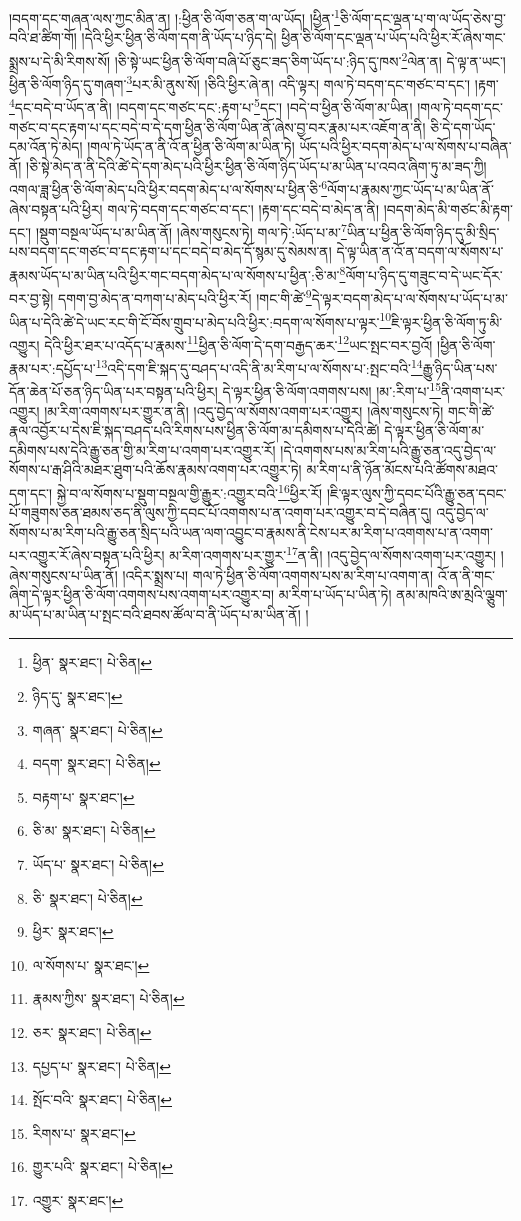 །བདག་དང་གཞན་ལས་ཀྱང་མིན་ན། །:ཕྱིན་ཅི་ལོག་ཅན་ག་ལ་ཡོད། །ཕྱིན་\footnote{ཕྱིན་  སྣར་ཐང་།  པེ་ཅིན། }ཅི་ལོག་དང་ལྡན་པ་ག་ལ་ཡོད་ཅེས་བྱ་བའི་ཐ་ཚིག་གོ། །དེའི་ཕྱིར་ཕྱིན་ཅི་ལོག་དག་ནི་ཡོད་པ་ཉིད་དེ། ཕྱིན་ཅི་ལོག་དང་ལྡན་པ་ཡོད་པའི་ཕྱིར་རོ་ཞེས་གང་སྨྲས་པ་དེ་མི་རིགས་སོ། །ཅི་སྟེ་ཡང་ཕྱིན་ཅི་ལོག་བཞི་པོ་ཅུང་ཟད་ཅིག་ཡོད་པ་:ཉིད་དུ་ཁས་\footnote{ཉིད་དུ་  སྣར་ཐང་། }ལེན་ན། དེ་ལྟ་ན་ཡང་། ཕྱིན་ཅི་ལོག་ཉིད་དུ་གཞག་\footnote{གཞན་  སྣར་ཐང་།  པེ་ཅིན། }པར་མི་ནུས་སོ། །ཅིའི་ཕྱིར་ཞེ་ན། འདི་ལྟར། གལ་ཏེ་བདག་དང་གཙང་བ་དང་། །རྟག་\footnote{བདག་  སྣར་ཐང་།  པེ་ཅིན། }དང་བདེ་བ་ཡོད་ན་ནི། །བདག་དང་གཙང་དང་:རྟག་པ་\footnote{བརྟག་པ་  སྣར་ཐང་། }དང་། །བདེ་བ་ཕྱིན་ཅི་ལོག་མ་ཡིན། །གལ་ཏེ་བདག་དང་གཙང་བ་དང་རྟག་པ་དང་བདེ་བ་དེ་དག་ཕྱིན་ཅི་ལོག་ཡིན་ནོ་ཞེས་བྱ་བར་རྣམ་པར་འཇོག་ན་ནི། ཅི་དེ་དག་ཡོད་དམ་འོན་ཏེ་མེད། །གལ་ཏེ་ཡོད་ན་ནི་འོ་ན་ཕྱིན་ཅི་ལོག་མ་ཡིན་ཏེ། ཡོད་པའི་ཕྱིར་བདག་མེད་པ་ལ་སོགས་པ་བཞིན་ནོ། །ཅི་སྟེ་མེད་ན་ནི་དེའི་ཚེ་དེ་དག་མེད་པའི་ཕྱིར་ཕྱིན་ཅི་ལོག་ཉིད་ཡོད་པ་མ་ཡིན་པ་འབའ་ཞིག་ཏུ་མ་ཟད་ཀྱི། འགལ་ཟླ་ཕྱིན་ཅི་ལོག་མེད་པའི་ཕྱིར་བདག་མེད་པ་ལ་སོགས་པ་ཕྱིན་ཅི་\footnote{ཅི་མ་  སྣར་ཐང་།  པེ་ཅིན། }ལོག་པ་རྣམས་ཀྱང་ཡོད་པ་མ་ཡིན་ནོ་ཞེས་བསྟན་པའི་ཕྱིར། གལ་ཏེ་བདག་དང་གཙང་བ་དང་། །རྟག་དང་བདེ་བ་མེད་ན་ནི། །བདག་མེད་མི་གཙང་མི་རྟག་དང་། །སྡུག་བསྔལ་ཡོད་པ་མ་ཡིན་ནོ། །ཞེས་གསུངས་ཏེ། གལ་ཏེ་:ཡོད་པ་མ་\footnote{ཡོད་པ་  སྣར་ཐང་།  པེ་ཅིན། }ཡིན་པ་ཕྱིན་ཅི་ལོག་ཉིད་དུ་མི་སྲིད་པས་བདག་དང་གཙང་བ་དང་རྟག་པ་དང་བདེ་བ་མེད་དོ་སྙམ་དུ་སེམས་ན། དེ་ལྟ་ཡིན་ན་འོ་ན་བདག་ལ་སོགས་པ་རྣམས་ཡོད་པ་མ་ཡིན་པའི་ཕྱིར་གང་བདག་མེད་པ་ལ་སོགས་པ་ཕྱིན་:ཅི་མ་\footnote{ཅི་  སྣར་ཐང་།  པེ་ཅིན། }ལོག་པ་ཉིད་དུ་གཟུང་བ་དེ་ཡང་དོར་བར་བྱ་སྟེ། དགག་བྱ་མེད་ན་བཀག་པ་མེད་པའི་ཕྱིར་རོ། །གང་གི་ཚེ་\footnote{ཕྱིར་  སྣར་ཐང་། }དེ་ལྟར་བདག་མེད་པ་ལ་སོགས་པ་ཡོད་པ་མ་ཡིན་པ་དེའི་ཚེ་དེ་ཡང་རང་གི་ངོ་བོས་གྲུབ་པ་མེད་པའི་ཕྱིར་:བདག་ལ་སོགས་པ་ལྟར་\footnote{ལ་སོགས་པ་  སྣར་ཐང་། }ཇི་ལྟར་ཕྱིན་ཅི་ལོག་ཏུ་མི་འགྱུར། དེའི་ཕྱིར་ཐར་པ་འདོད་པ་རྣམས་\footnote{རྣམས་ཀྱིས་  སྣར་ཐང་།  པེ་ཅིན། }ཕྱིན་ཅི་ལོག་དེ་དག་བརྒྱད་ཆར་\footnote{ཅར་  སྣར་ཐང་།  པེ་ཅིན། }ཡང་སྤང་བར་བྱའོ། །ཕྱིན་ཅི་ལོག་རྣམ་པར་:དཔྱོད་པ་\footnote{དཔྱད་པ་  སྣར་ཐང་།  པེ་ཅིན། }འདི་དག་ཇི་སྐད་དུ་བཤད་པ་འདི་ནི་མ་རིག་པ་ལ་སོགས་པ་:སྤང་བའི་\footnote{སྤོང་བའི་  སྣར་ཐང་།  པེ་ཅིན། }རྒྱུ་ཉིད་ཡིན་པས་དོན་ཆེན་པོ་ཅན་ཉིད་ཡིན་པར་བསྟན་པའི་ཕྱིར། དེ་ལྟར་ཕྱིན་ཅི་ལོག་འགགས་པས། །མ་:རིག་པ་\footnote{རིགས་པ་  སྣར་ཐང་། }ནི་འགག་པར་འགྱུར། །མ་རིག་འགགས་པར་གྱུར་ན་ནི། །འདུ་བྱེད་ལ་སོགས་འགག་པར་འགྱུར། །ཞེས་གསུངས་ཏེ། གང་གི་ཚེ་རྣལ་འབྱོར་པ་དེས་ཇི་སྐད་བཤད་པའི་རིགས་པས་ཕྱིན་ཅི་ལོག་མ་དམིགས་པ་དེའི་ཚེ། དེ་ལྟར་ཕྱིན་ཅི་ལོག་མ་དམིགས་པས་དེའི་རྒྱུ་ཅན་གྱི་མ་རིག་པ་འགག་པར་འགྱུར་རོ། །དེ་འགགས་པས་མ་རིག་པའི་རྒྱུ་ཅན་འདུ་བྱེད་ལ་སོགས་པ་རྒ་ཤིའི་མཐར་ཐུག་པའི་ཆོས་རྣམས་འགག་པར་འགྱུར་ཏེ། མ་རིག་པ་ནི་ཉོན་མོངས་པའི་ཚོགས་མཐའ་དག་དང་། སྐྱེ་བ་ལ་སོགས་པ་སྡུག་བསྔལ་གྱི་རྒྱུར་:འགྱུར་བའི་\footnote{གྱུར་པའི་  སྣར་ཐང་།  པེ་ཅིན། }ཕྱིར་རོ། །ཇི་ལྟར་ལུས་ཀྱི་དབང་པོའི་རྒྱུ་ཅན་དབང་པོ་གཟུགས་ཅན་ཐམས་ཅད་ནི་ལུས་ཀྱི་དབང་པོ་འགགས་པ་ན་འགག་པར་འགྱུར་བ་དེ་བཞིན་དུ། འདུ་བྱེད་ལ་སོགས་པ་མ་རིག་པའི་རྒྱུ་ཅན་སྲིད་པའི་ཡན་ལག་འབྱུང་བ་རྣམས་ནི་ངེས་པར་མ་རིག་པ་འགགས་པ་ན་འགག་པར་འགྱུར་རོ་ཞེས་བསྟན་པའི་ཕྱིར། མ་རིག་འགགས་པར་གྱུར་\footnote{འགྱུར་  སྣར་ཐང་། }ན་ནི། །འདུ་བྱེད་ལ་སོགས་འགག་པར་འགྱུར། །ཞེས་གསུངས་པ་ཡིན་ནོ། །འདིར་སྨྲས་པ། གལ་ཏེ་ཕྱིན་ཅི་ལོག་འགགས་པས་མ་རིག་པ་འགག་ན། འོ་ན་ནི་གང་ཞིག་དེ་ལྟར་ཕྱིན་ཅི་ལོག་འགགས་པས་འགག་པར་འགྱུར་བ། མ་རིག་པ་ཡོད་པ་ཡིན་ཏེ། ནམ་མཁའི་ཨ་མྲའི་ལྕུག་མ་ཡོད་པ་མ་ཡིན་པ་སྤང་བའི་ཐབས་ཚོལ་བ་ནི་ཡོད་པ་མ་ཡིན་ནོ། །
